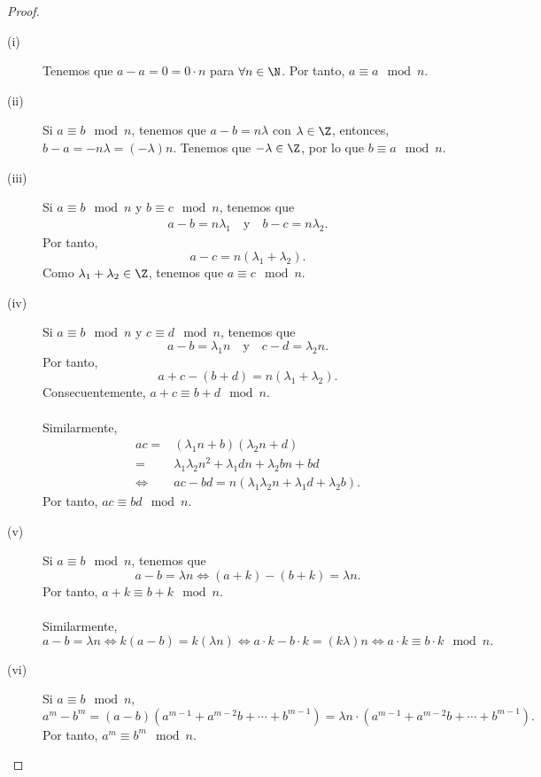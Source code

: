 \begin{proof}
\begin{description}
\item[(i)] Tenemos que $\displaystyle a - a = 0 = 0 \cdot n $ para $\displaystyle \forall n \in \N $. Por tanto, $\displaystyle a \equiv a \mod n $.
\item[(ii)] Si $\displaystyle a \equiv b \mod n $, tenemos que $\displaystyle a - b = n\lambda $ con $\displaystyle \lambda \in \Z $, entonces, $\displaystyle b - a = - n \lambda = \left(-\lambda\right)n $. Tenemos que $\displaystyle -\lambda \in \Z $, por lo que $\displaystyle b \equiv a \mod n $.
\item[(iii)] Si $\displaystyle a \equiv b \mod n $ y $\displaystyle b \equiv c \mod n $, tenemos que
\[
\begin{split}
a - b = n\lambda_{1} \quad \text{y} \quad b - c = n \lambda_{2}.
\end{split}
\]
Por tanto, 
\[a - c = n\left(\lambda_{1}+\lambda_{2}\right) .\]
Como $\displaystyle \lambda_{1}+\lambda_{2} \in \Z $, tenemos que $\displaystyle a \equiv c \mod n $.
\item[(iv)] Si $\displaystyle a \equiv b \mod n $ y $\displaystyle c \equiv d \mod n $, tenemos que
\[a - b = \lambda_{1}n \quad \text{y} \quad c - d = \lambda_{2}n .\]
Por tanto, 
\[a + c - \left(b + d\right) = n \left(\lambda_{1} + \lambda_{2}\right) .\]
Consecuentemente, $\displaystyle a + c \equiv b + d \mod n $. \\ \\
Similarmente, 
\[
\begin{split}
	ac  = & \left(\lambda_{1}n +b\right)\left(\lambda_{2}n + d\right) \\
	= & \lambda_{1}\lambda_{2}n^{2}+\lambda_{1}dn+\lambda_{2}bn+bd \\
	\iff & ac - bd = n\left(\lambda_{1}\lambda_{2}n + \lambda_{1}d + \lambda_{2}b\right) .
\end{split}
\]
Por tanto, $\displaystyle ac \equiv bd \mod n $.
\item[(v)] Si $\displaystyle a \equiv b \mod n $, tenemos que
	\[a - b = \lambda n \iff \left(a + k\right) - \left(b + k\right) = \lambda n .\]
Por tanto, $\displaystyle a + k \equiv b + k \mod n $. \\ \\
Similarmente, 
\[a - b = \lambda n \iff k\left(a - b\right) = k (\lambda n) \iff a \cdot k - b \cdot k = \left(k\lambda\right) n \iff a \cdot k \equiv b \cdot k \mod n.\]
\item[(vi)] Si $\displaystyle a \equiv b \mod n $, 
	\[a^{m} - b^{m} = \left(a - b\right)\left(a^{m-1} + a^{m-2}b+\cdots+b^{m-1}\right) = \lambda n \cdot \left(a^{m-1} + a^{m-2}b+\cdots+b^{m-1}\right) .\]
	Por tanto, $\displaystyle a^{m} \equiv b^{m} \mod n $. 
\end{description}
\end{proof}


